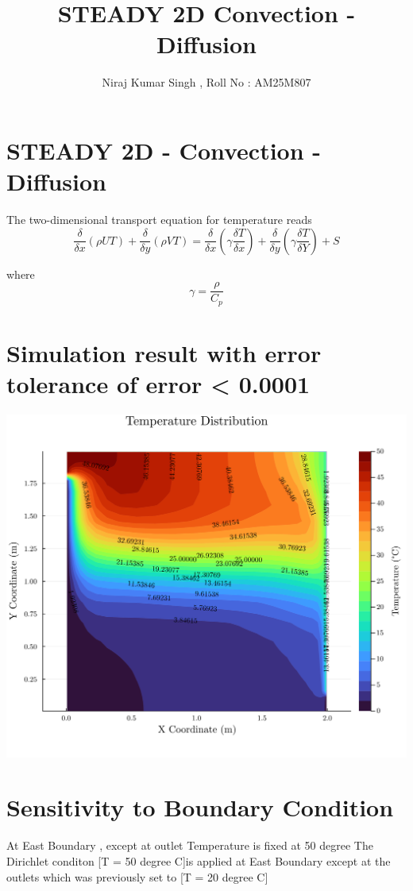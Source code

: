 \documentclass[11pt,twocolumn]{article}
\author{Niraj Kumar Singh , Roll No : AM25M807}
\title{STEADY 2D Convection - Diffusion}
\begin{document}
\maketitle

\section{STEADY  2D  - Convection  - Diffusion}
\label{sec:orgb6eb954}
The two-dimensional transport equation for temperature reads
\[\frac{\delta}{\delta x}(\rho U T) + \frac{\delta}{\delta y} (\rho V T)  = \frac{\delta}{\delta x} (\gamma \frac{\delta T}{\delta x}  ) + \frac{\delta}{\delta y} (\gamma \frac{\delta T}{\delta Y}) + S\]

where
\[ \gamma = \frac{\rho}{C_p} \]
\section{Simulation result with error tolerance of  error < 0.0001}
\label{sec:orge1eb83b}
\begin{center}
\includegraphics[width=.9\linewidth]{./result.png}
\end{center}
\section{Sensitivity to Boundary Condition}
\label{sec:org653d2bd}
At East Boundary , except at outlet Temperature is fixed  at 50 degree
The Dirichlet conditon [T = 50 degree C]is applied at East Boundary except at the outlets which was previously set to [T = 20 degree C] 
\end{document}
